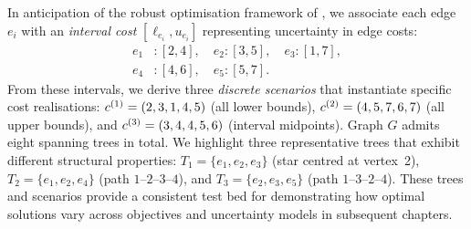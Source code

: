 In anticipation of the robust optimisation framework of , we associate each edge $e_i$ with an \emph{interval cost} $[\ell_{e_i}, u_{e_i}]$ representing uncertainty in edge costs:
\begin{align*}
e_1 &\colon [2, 4], \quad e_2 \colon [3, 5], \quad e_3 \colon [1, 7], \\
e_4 &\colon [4, 6], \quad e_5 \colon [5, 7].
\end{align*}%
From these intervals, we derive three \emph{discrete scenarios} that instantiate specific cost realisations: $c^{(1)} = (2, 3, 1, 4, 5)$ (all lower bounds), $c^{(2)} = (4, 5, 7, 6, 7)$ (all upper bounds), and $c^{(3)} = (3, 4, 4, 5, 6)$ (interval midpoints).
Graph $G$ admits eight spanning trees in total.
We highlight three representative trees that exhibit different structural properties: $T_1 = \{e_1, e_2, e_3\}$ (star centred at vertex~2), $T_2 = \{e_1, e_2, e_4\}$ (path $1$--$2$--$3$--$4$), and $T_3 = \{e_2, e_3, e_5\}$ (path $1$--$3$--$2$--$4$).
These trees and scenarios provide a consistent test bed for demonstrating how optimal solutions vary across objectives and uncertainty models in subsequent chapters.

